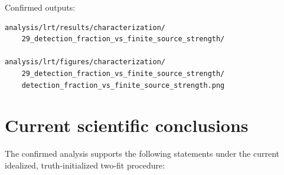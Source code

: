 \documentclass[11pt,a4paper]{article}
\begin{document}
Confirmed outputs:
\begin{verbatim}
analysis/lrt/results/characterization/
    29_detection_fraction_vs_finite_source_strength/

analysis/lrt/figures/characterization/
    29_detection_fraction_vs_finite_source_strength/
    detection_fraction_vs_finite_source_strength.png
\end{verbatim}

\section{Current scientific conclusions}

The confirmed analysis supports the following statements under the current idealized,
truth-initialized two-fit procedure:
\end{document}
